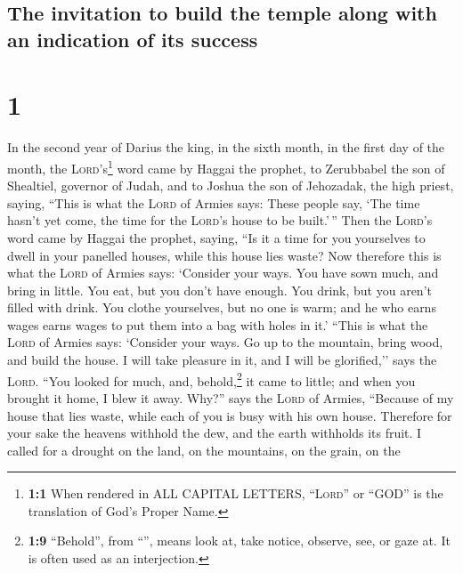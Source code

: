 \hypertarget{the-invitation-to-build-the-temple-along-with-an-indication-of-its-success}{%
\subsection{The invitation to build the temple along with an indication
of its
success}\label{the-invitation-to-build-the-temple-along-with-an-indication-of-its-success}}

\hypertarget{section}{%
\section{1}\label{section}}

 In the second year of Darius the king, in the sixth
month, in the first day of the month, the \textsc{Lord}'s\footnote{\textbf{1:1}
  When rendered in ALL CAPITAL LETTERS, ``\textsc{Lord}'' or ``GOD'' is
  the translation of God's Proper Name.} word came by Haggai the
prophet, to Zerubbabel the son of Shealtiel, governor of Judah, and to
Joshua the son of Jehozadak, the high priest, saying, 
``This is what the \textsc{Lord} of Armies says: These people say, `The
time hasn't yet come, the time for the \textsc{Lord}'s house to be
built.'\,''  Then the \textsc{Lord}'s word came by Haggai
the prophet, saying,  ``Is it a time for you yourselves to
dwell in your panelled houses, while this house lies waste?
 Now therefore this is what the \textsc{Lord} of Armies
says: `Consider your ways.  You have sown much, and bring
in little. You eat, but you don't have enough. You drink, but you aren't
filled with drink. You clothe yourselves, but no one is warm; and he who
earns wages earns wages to put them into a bag with holes in it.'
 ``This is what the \textsc{Lord} of Armies says:
`Consider your ways.  Go up to the mountain, bring wood,
and build the house. I will take pleasure in it, and I will be
glorified,'' says the \textsc{Lord}.  ``You looked for
much, and, behold,\footnote{\textbf{1:9} ``Behold'', from
  ``'', means look at, take notice, observe, see, or gaze
  at. It is often used as an interjection.} it came to little; and when
you brought it home, I blew it away. Why?'' says the \textsc{Lord} of
Armies, ``Because of my house that lies waste, while each of you is busy
with his own house.  Therefore for your sake the heavens
withhold the dew, and the earth withholds its fruit.  I
called for a drought on the land, on the mountains, on the grain, on the
